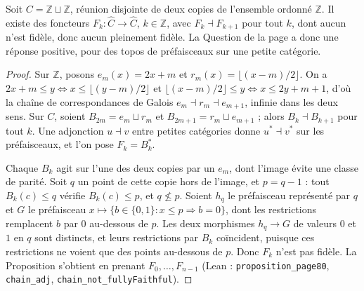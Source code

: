 \begin{encadre}
\begin{theoreme}\label{thm:19-infinie}
Soit $C = \mathbb Z \sqcup \mathbb Z$, réunion disjointe de deux copies de l'ensemble ordonné $\mathbb Z$. Il existe des foncteurs $F_k : \widehat C \to \widehat C$, $k \in \mathbb Z$, avec $F_k \dashv F_{k+1}$ pour tout $k$, dont aucun n'est fidèle, donc aucun pleinement fidèle. La Question de la page a donc une réponse positive, pour des topos de préfaisceaux sur une petite catégorie.
\end{theoreme}
\end{encadre}

\begin{proof}
Sur $\mathbb Z$, posons $e_m(x) = 2x + m$ et $r_m(x) = \lfloor (x - m)/2 \rfloor$. On a $2x + m \leqslant y \iff x \leqslant \lfloor (y-m)/2 \rfloor$ et $\lfloor (x-m)/2 \rfloor \leqslant y \iff x \leqslant 2y + m + 1$, d'où la chaîne de correspondances de Galois $e_m \dashv r_m \dashv e_{m+1}$, infinie dans les deux sens. Sur $C$, soient $B_{2m} = e_m \sqcup r_m$ et $B_{2m+1} = r_m \sqcup e_{m+1}$ ; alors $B_k \dashv B_{k+1}$ pour tout $k$. Une adjonction $u \dashv v$ entre petites catégories donne $u^* \dashv v^*$ sur les préfaisceaux, et l'on pose $F_k = B_k^*$.

Chaque $B_k$ agit sur l'une des deux copies par un $e_m$, dont l'image évite une classe de parité. Soit $q$ un point de cette copie hors de l'image, et $p = q - 1$ : tout $B_k(c) \leqslant q$ vérifie $B_k(c) \leqslant p$, et $q \not\leqslant p$. Soient $h_q$ le préfaisceau représenté par $q$ et $G$ le préfaisceau $x \mapsto \{b \in \{0, 1\} : x \leqslant p \Rightarrow b = 0\}$, dont les restrictions remplacent $b$ par $0$ au-dessous de $p$. Les deux morphismes $h_q \to G$ de valeurs $0$ et $1$ en $q$ sont distincts, et leurs restrictions par $B_k$ coïncident, puisque ces restrictions ne voient que des points au-dessous de $p$. Donc $F_k$ n'est pas fidèle. La Proposition s'obtient en prenant $F_0, \ldots, F_{n-1}$ (Lean : \texttt{proposition\_page80}, \texttt{chain\_adj}, \texttt{chain\_not\_fullyFaithful}).
\end{proof}

